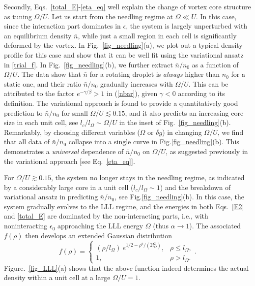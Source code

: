 \documentclass[reprint,aps,pra,twocolumn,superscriptaddress]{revtex4-1}
\begin{document}
Secondly, Eqs.~\eqref{total_E}-\eqref{eta_eq} well explain the change of vortex core structure as tuning $\Omega/U$.
Let us start from the needling regime at $\Omega\ll U$. In this case, since the interaction part dominates in $\epsilon$, the system is largely unperturbed with an equilibrium density $\bar{n}$, while just a small region in each cell is significantly deformed by the vortex. In Fig.~\ref{fig_needling}(a), we plot out a typical density profile for this case and show that it can be well fit using the variational ansatz in \eqref{trial_f}.
In Fig.~\ref{fig_needling}(b), we further extract $\bar{n}/n_0$ as a function of $\Omega/U$. The data show that $\bar{n}$ for a rotating droplet is {\it always} higher than $n_0$ for a static one, and their ratio $\bar{n}/n_0$ gradually increases with $\Omega/U$. This can be attributed to the factor $e^{-\gamma/\beta}>1$ in (\ref{nbar}), given $\gamma<0$ according to its definition. The  variational approach is found to provide a quantitatively good prediction to $\bar{n}/n_0$ for small $\Omega/U\lesssim 0.15$, and it also predicts an increasing core size in each unit cell, see $l_c/l_{\Omega}\sim \Omega/U$ in the inset of Fig.~\ref{fig_needling}(b). Remarkably, by choosing different variables ($\Omega$ or $\delta g$) in changing $\Omega/U$, we find that all data of $\bar{n}/n_0$ collapse into a single curve in Fig.\ref{fig_needling}(b). This demonstrates a {\it universal} dependence of $\bar{n}/n_0$ on $\Omega/U$, as suggested previously in the variational approach [see Eq.~\eqref{eta_eq}]. 

For $\Omega/U\gtrsim 0.15$,  the system no longer stays in the needling regime, as indicated by a considerably large core in a unit cell ($l_c/l_{\Omega}\sim 1$) and the breakdown of variational ansatz in predicting $\bar{n}/n_0$, see Fig.\ref{fig_needling}(b). In this case, the system gradually evolves to the LLL regime, and the energies in both Eqs.~\eqref{E2} and \eqref{total_E} are dominated by the non-interacting parts, i.e., with noninteracting $\epsilon_0$ approaching the LLL energy $\Omega$ (thus $\alpha\rightarrow 1$). The associated $f(\rho)$ then develops an extended Gaussian distribution 
\begin{equation}
    f({\rho})=\begin{cases}
        (\rho/l_\Omega)\ e^{1/2-\rho^2/(2l_\Omega^2)}, & \rho\le l_\Omega, \\
        1, & \rho> l_\Omega.
    \end{cases} .
    \label{Gaussian}
\end{equation}
Figure.~\ref{fig_LLL}(a) shows that the above function indeed determines the actual density within a unit cell at a large $\Omega/U=1$.
\end{document}
